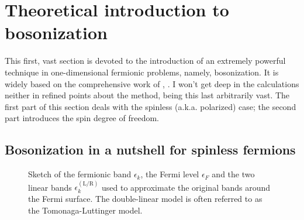 \section{Theoretical introduction to bosonization}

This first, vast section is devoted to the introduction of an extremely powerful technique in one-dimensional fermionic problems, namely, bosonization. It is widely based on the comprehensive work of \citeauthor{giamarchi2003quantum}, \cite{giamarchi2003quantum}. I won't get deep in the calculations neither in refined points about the method, being this last arbitrarily vast. The first part of this section deals with the spinless (a.k.a. polarized) case; the second part introduces the spin degree of freedom.

\subsection{Bosonization in a nutshell for spinless fermions}

\begin{figure}
	\centering
	
	\caption{Sketch of the fermionic band $\epsilon_k$, the Fermi level $\epsilon_F$ and the two linear bands $\epsilon_k^{(\mathrm{L}/\mathrm{R})}$ used to approximate the original bands around the Fermi surface. The double-linear model is often referred to as the Tomonaga-Luttinger model.}
	\label{fig:bands}
\end{figure}

